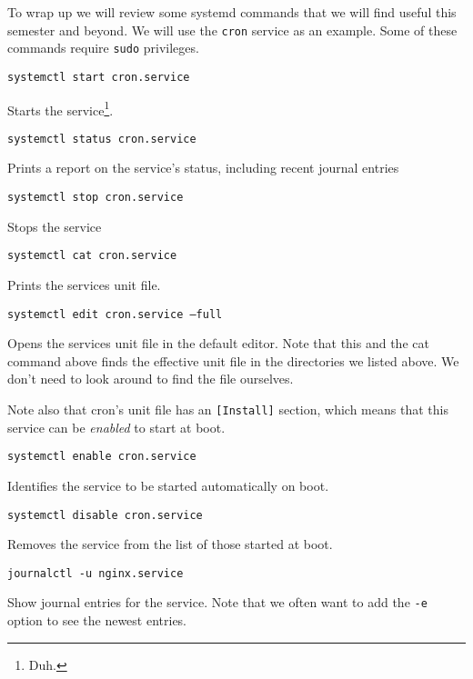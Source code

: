 \documentclass{article}
\begin{document}
To wrap up we will review some systemd commands that we will find useful this semester and beyond. We will use the \texttt{cron} service as an example. Some of these commands require \texttt{sudo} privileges.

\texttt{systemctl start cron.service}

Starts the service\footnote{Duh.}.

\texttt{systemctl status cron.service}

Prints a report on the service's status, including recent journal entries

\texttt{systemctl stop cron.service}

Stops the service

\texttt{systemctl cat cron.service}

Prints the services unit file.

\texttt{systemctl edit cron.service --full}

Opens the services unit file in the default editor. Note that this and the cat command above finds the effective unit file in the directories we listed above. We don't need to look around to find the file ourselves.

Note also that cron's unit file has an \texttt{[Install]} section, which means that this service can be \emph{enabled} to start at boot.

\texttt{systemctl enable cron.service}

Identifies the service to be started automatically on boot. 

\texttt{systemctl disable cron.service}

Removes the service from the list of those started at boot.

\texttt{journalctl -u nginx.service}

Show journal entries for the service. Note that we often want to add the \texttt{-e} option to see the newest entries.
\end{document}
